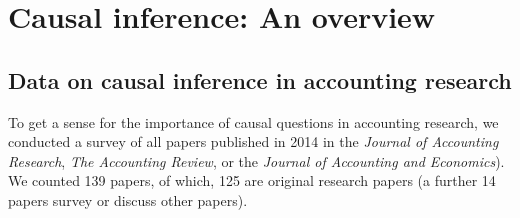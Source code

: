 \documentclass[11pt]{amsart}
\begin{document}
\section{Causal inference: An overview}

%



\subsection{Data on causal inference in accounting research}


To get a sense for the importance of causal questions in accounting research,
we conducted a survey of all papers published in 2014 in the  \textit{Journal of Accounting Research}, \textit{The Accounting Review}, or the \textit{Journal of Accounting and Economics}).
We counted 139 papers, of which, 125 are original research papers (a further 14 papers survey or discuss other papers).
\end{document}
